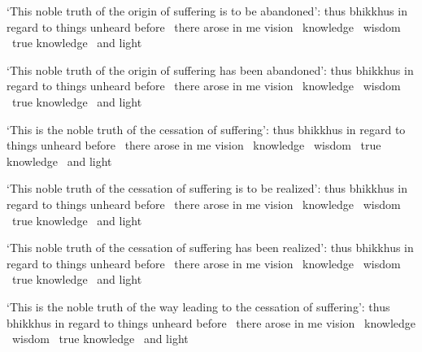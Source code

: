 \begin{english-only-hang}
  `This noble truth of the origin of suffering is to be abandoned': thus bhikkhus in regard to things unheard before \breathmark\ there arose in me vision \breathmark\ knowledge \breathmark\ wisdom \breathmark\ true knowledge \breathmark\ and light
\end{english-only-hang}

\begin{english-only-hang}
  `This noble truth of the origin of suffering has been abandoned': thus bhikkhus in regard to things unheard before \breathmark\ there arose in me vision \breathmark\ knowledge \breathmark\ wisdom \breathmark\ true knowledge \breathmark\ and light
\end{english-only-hang}

\begin{english-only-hang}
  `This is the noble truth of the cessation of suffering': thus bhikkhus in regard to things unheard before \breathmark\ there arose in me vision \breathmark\ knowledge \breathmark\ wisdom \breathmark\ true knowledge \breathmark\ and light
\end{english-only-hang}

\begin{english-only-hang}
  `This noble truth of the cessation of suffering is to be realized': thus bhikkhus  in regard to things unheard before \breathmark\ there arose in me vision \breathmark\ knowledge \breathmark\ wisdom \breathmark\ true knowledge \breathmark\ and light
\end{english-only-hang}

\ifninebythirteen\clearpage\fi

\begin{english-only-hang}
  `This noble truth of the cessation of suffering has been realized': thus bhikkhus  in regard to things unheard before \breathmark\ there arose in me vision \breathmark\ knowledge \breathmark\ wisdom \breathmark\ true knowledge \breathmark\ and light
\end{english-only-hang}

\begin{english-only-hang}
  `This is the noble truth of the way leading to the cessation of suffering': thus bhikkhus  in regard to things unheard before \breathmark\ there arose in me vision \breathmark\ knowledge \breathmark\ wisdom \breathmark\ true knowledge \breathmark\ and light
\end{english-only-hang}

